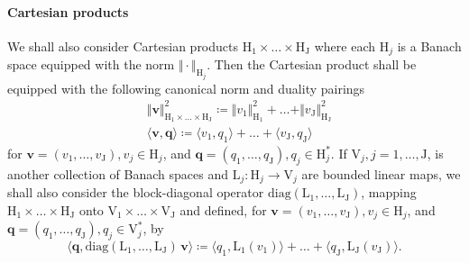 \documentclass[a4paper,11pt]{article}
\newcommand{\mrm}{\mathrm}
\newcommand{\mL}{\mathrm{L}}
\newcommand{\mH}{\mathrm{H}}
\newcommand{\mJ}{\mathrm{J}}
\newcommand{\mV}{\mathrm{V}}
\newcommand{\bv}{\boldsymbol{v}}
\newcommand{\bq}{\boldsymbol{q}}
\begin{document}
\paragraph{Cartesian products} We shall also consider Cartesian products
$\mH_{1}\times \dots\times \mH_{\mJ}$ where each $\mH_{j}$ is a Banach space
equipped with the norm $\Vert\cdot\Vert_{\mH_{j}}$. Then the Cartesian product
shall be equipped with the following canonical norm and duality pairings
\begin{equation*}
  \begin{aligned}
    & \Vert \bv\Vert_{\mH_{1}\times \dots\times \mH_{\mJ}}^{2} \coloneq
    \Vert v_1\Vert_{\mH_{1}}^{2}+\dots +\Vert v_{\mJ}\Vert_{\mH_{\mJ}}^{2}\\
    & \langle \bv,\bq \rangle \coloneq
    \langle v_1,q_1\rangle + \dots + \langle v_\mJ,q_\mJ\rangle
  \end{aligned}
\end{equation*}
for $\bv = (v_1,\dots,v_\mJ), v_j\in\mH_{j}$, and
$\bq = (q_1,\dots,q_{\mJ}), q_{j}\in\mH^{*}_{j}$.
If $\mV_{j},j=1,\dots,\mJ$, is another collection of Banach spaces
and $\mL_{j}\colon\mH_{j}\to \mV_{j}$ are bounded linear maps, we
shall also consider the block-diagonal operator
$\mrm{diag}(\mL_{1},\dots,\mL_{\mJ})$,
mapping $\mH_{1}\times \dots\times \mH_{\mJ}$ onto
$\mV_{1}\times \dots\times \mV_{\mJ}$ and defined,
for $\bv = (v_1,\dots,v_\mJ), v_j\in\mH_{j}$, and
$\bq = (q_1,\dots,q_{\mJ}), q_j\in\mV_{j}^*$, by
\begin{equation*}
  \langle \bq, \mrm{diag}(\mL_{1},\dots,\mL_{\mJ})\,\bv\rangle \coloneq
  \langle q_1,\mL_{1}(v_1)\rangle + \dots +
  \langle q_{\mJ},\mL_{\mJ}(v_{\mJ}) \rangle.
\end{equation*}
\end{document}
